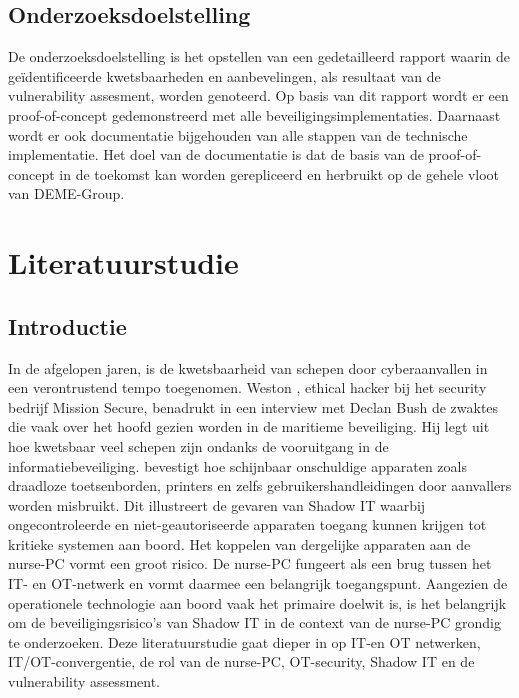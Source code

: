 \subsection{Onderzoeksdoelstelling}
De onderzoeksdoelstelling is het opstellen van een gedetailleerd rapport waarin de geïdentificeerde kwetsbaarheden en aanbevelingen, als resultaat van de vulnerability assesment, worden genoteerd.
Op basis van dit rapport wordt er een proof-of-concept gedemonstreerd met alle beveiligingsimplementaties.
Daarnaast wordt er ook documentatie bijgehouden van alle stappen van de technische implementatie.
Het doel van de documentatie is dat de basis van de proof-of-concept in de toekomst kan worden gerepliceerd en herbruikt op de gehele vloot van DEME-Group.



\section{Literatuurstudie}%
\label{sec:literatuurstudie}
\subsection{Introductie}
In de afgelopen jaren, is de kwetsbaarheid van schepen door cyberaanvallen in een verontrustend tempo toegenomen. Weston \textcite{Hecker2021}, ethical hacker bij het security bedrijf 
Mission Secure, benadrukt in een interview met Declan Bush de zwaktes die vaak over het hoofd gezien worden in de maritieme beveiliging. Hij
legt uit hoe kwetsbaar veel schepen zijn ondanks de vooruitgang in de informatiebeveiliging. \textcite{Hecker2021} bevestigt hoe schijnbaar onschuldige apparaten zoals draadloze toetsenborden, printers en 
zelfs gebruikershandleidingen door aanvallers worden misbruikt. Dit illustreert de gevaren van Shadow IT waarbij ongecontroleerde en niet-geautoriseerde apparaten toegang kunnen krijgen tot kritieke systemen aan boord. 
Het koppelen van dergelijke apparaten aan de nurse-PC vormt een groot risico. De nurse-PC fungeert als een brug tussen het IT- en OT-netwerk en vormt daarmee een belangrijk toegangspunt. 
Aangezien de operationele technologie aan boord vaak het primaire doelwit is, is het belangrijk om de beveiligingsrisico's van Shadow IT in de context van de nurse-PC grondig te onderzoeken.
Deze literatuurstudie gaat dieper in op IT-en OT netwerken, IT/OT-convergentie, de rol van de nurse-PC, OT-security, Shadow IT en de vulnerability assessment.


